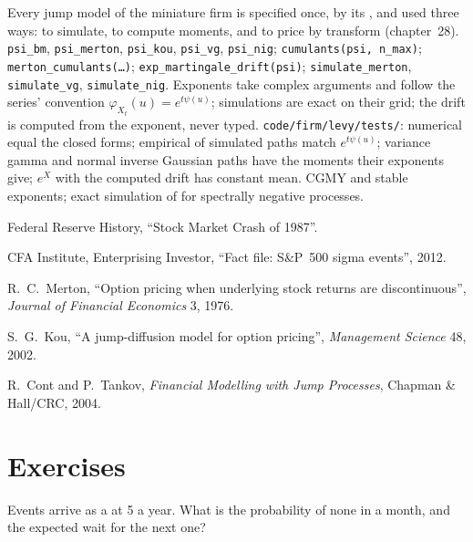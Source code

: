 \begin{build}
 Every jump model of the miniature firm is specified once, by its , and used three ways: to simulate, to compute moments, and to price by transform
(chapter~28).
 \texttt{psi\_bm}, \texttt{psi\_merton}, \texttt{psi\_kou}, \texttt{psi\_vg},
\texttt{psi\_nig}; \texttt{cumulants(psi, n\_max)}; \texttt{merton\_cumulants(\dots)};
\texttt{exp\_martingale\_drift(psi)}; \texttt{simulate\_merton}, \texttt{simulate\_vg},
\texttt{simulate\_nig}.
 Exponents take complex arguments and follow the series' convention $\varphi_{X_t}(u) =
e^{t\psi(u)}$; simulations are exact on their grid; the  drift is computed from the exponent,
never typed.
 \texttt{code/firm/levy/tests/}: numerical  equal the closed forms;
empirical  of simulated paths match $e^{t\psi(u)}$; variance gamma and normal
inverse Gaussian paths have the moments their exponents give; $e^X$ with the computed drift has constant
mean.
 CGMY and stable exponents; exact simulation of  for spectrally
negative processes.
\end{build}

\begin{omsources}
\item Federal Reserve History, ``Stock Market Crash of 1987''.
\item CFA Institute, Enterprising Investor, ``Fact file: S\&P~500 sigma events'', 2012.
\item R.~C.~Merton, ``Option pricing when underlying stock returns are discontinuous'',
\emph{Journal of Financial Economics} 3, 1976.
\item S.~G.~Kou, ``A jump-diffusion model for option pricing'', \emph{Management Science} 48, 2002.
\item R.~Cont and P.~Tankov, \emph{Financial Modelling with Jump Processes}, Chapman \& Hall/CRC, 2004.
\end{omsources}

\section{Exercises}

\begin{exercise}[$\star$]\label{exo:qm:jump-processes:1}
Events arrive as a  at 5 a year. What is the probability of none in a month, and the
expected wait for the next one?
\end{exercise}

